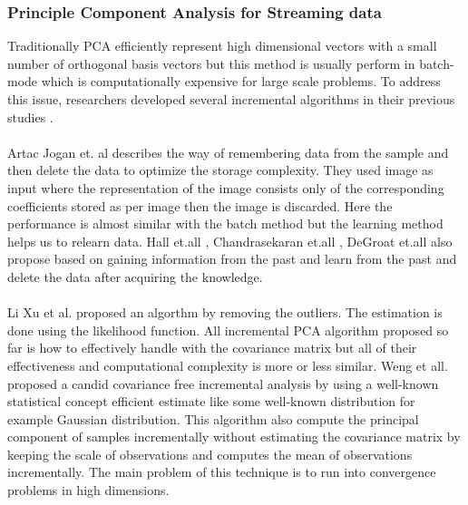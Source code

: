\subsubsection{Principle Component Analysis for Streaming data}
Traditionally PCA efficiently represent high dimensional vectors with a small number of orthogonal basis vectors but this method is usually perform in batch-mode which is computationally expensive for large scale problems. To address this issue, researchers developed several incremental algorithms in their previous studies \cite{thesis4}.\\\\
Artac Jogan et. al \cite{p315} describes the way of remembering data from the sample and then delete the data to optimize the storage complexity. They used image as input where the representation of the image consists only of the corresponding coefficients stored as per image then the image is discarded. Here the performance is almost similar with the batch method but the learning method helps us to relearn data. Hall et.all \cite{thesis9}, Chandrasekaran et.all \cite{1thesis0}, DeGroat et.all also propose based on gaining information from the past and learn from the past and delete the data after acquiring the knowledge.\\\\
Li Xu et al. proposed an algorthm by removing the outliers. The estimation is done using the likelihood function.
All incremental PCA algorithm proposed so far is how to effectively handle with the covariance matrix but all of their effectiveness and computational complexity is more or less similar. Weng et all. \cite{thesis5} proposed a candid covariance free incremental analysis by using a well-known statistical concept efficient estimate like some well-known distribution for example Gaussian distribution. This algorithm also compute the principal component of samples incrementally without estimating the covariance matrix by keeping the scale of observations and computes the mean of observations incrementally. The main problem of this technique is to run into convergence problems in high dimensions.
